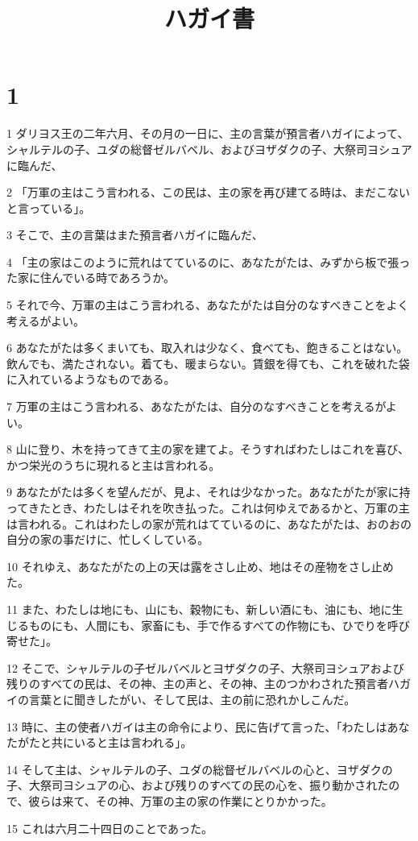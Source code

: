 

\title{ハガイ書}


\chapter{1}

\par 1 ダリヨス王の二年六月、その月の一日に、主の言葉が預言者ハガイによって、シャルテルの子、ユダの総督ゼルバベル、およびヨザダクの子、大祭司ヨシュアに臨んだ、
\par 2 「万軍の主はこう言われる、この民は、主の家を再び建てる時は、まだこないと言っている」。
\par 3 そこで、主の言葉はまた預言者ハガイに臨んだ、
\par 4 「主の家はこのように荒れはてているのに、あなたがたは、みずから板で張った家に住んでいる時であろうか。
\par 5 それで今、万軍の主はこう言われる、あなたがたは自分のなすべきことをよく考えるがよい。
\par 6 あなたがたは多くまいても、取入れは少なく、食べても、飽きることはない。飲んでも、満たされない。着ても、暖まらない。賃銀を得ても、これを破れた袋に入れているようなものである。
\par 7 万軍の主はこう言われる、あなたがたは、自分のなすべきことを考えるがよい。
\par 8 山に登り、木を持ってきて主の家を建てよ。そうすればわたしはこれを喜び、かつ栄光のうちに現れると主は言われる。
\par 9 あなたがたは多くを望んだが、見よ、それは少なかった。あなたがたが家に持ってきたとき、わたしはそれを吹き払った。これは何ゆえであるかと、万軍の主は言われる。これはわたしの家が荒れはてているのに、あなたがたは、おのおの自分の家の事だけに、忙しくしている。
\par 10 それゆえ、あなたがたの上の天は露をさし止め、地はその産物をさし止めた。
\par 11 また、わたしは地にも、山にも、穀物にも、新しい酒にも、油にも、地に生じるものにも、人間にも、家畜にも、手で作るすべての作物にも、ひでりを呼び寄せた」。
\par 12 そこで、シャルテルの子ゼルバベルとヨザダクの子、大祭司ヨシュアおよび残りのすべての民は、その神、主の声と、その神、主のつかわされた預言者ハガイの言葉とに聞きしたがい、そして民は、主の前に恐れかしこんだ。
\par 13 時に、主の使者ハガイは主の命令により、民に告げて言った、「わたしはあなたがたと共にいると主は言われる」。
\par 14 そして主は、シャルテルの子、ユダの総督ゼルバベルの心と、ヨザダクの子、大祭司ヨシュアの心、および残りのすべての民の心を、振り動かされたので、彼らは来て、その神、万軍の主の家の作業にとりかかった。
\par 15 これは六月二十四日のことであった。

